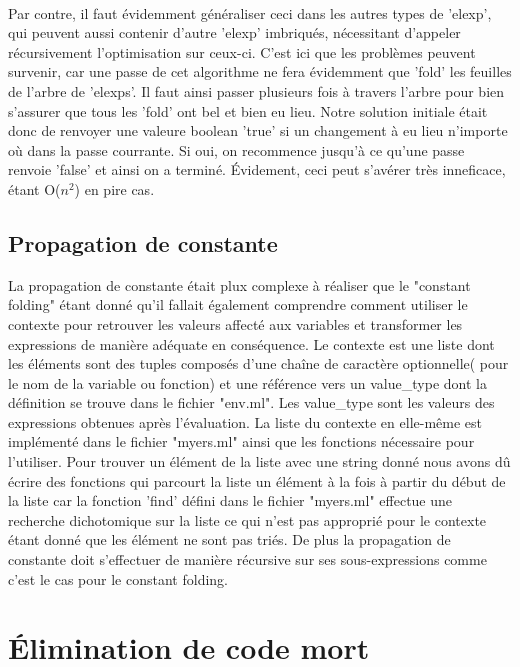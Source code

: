\documentclass{article}
\begin{document}
\paragraph{}
Par contre, il faut évidemment généraliser ceci dans les autres types de 'elexp', qui peuvent aussi contenir d'autre 'elexp' imbriqués, nécessitant d'appeler récursivement l'optimisation sur ceux-ci. C'est ici que les problèmes peuvent survenir, car une passe de cet algorithme ne fera évidemment que 'fold' les feuilles de l'arbre de 'elexps'. Il faut ainsi passer plusieurs fois à travers l'arbre pour bien s'assurer que tous les 'fold' ont bel et bien eu lieu. Notre solution initiale était donc de renvoyer une valeure boolean 'true' si un changement à eu lieu n'importe où dans la passe courrante. Si oui, on recommence jusqu'à ce qu'une passe renvoie 'false' et ainsi on a terminé. Évidement, ceci peut s'avérer très inneficace, étant O($n^2$) en pire cas.


\subsection{Propagation de constante}

La propagation de constante était plux complexe à réaliser que le "constant
folding" étant donné qu'il fallait également comprendre comment utiliser le 
contexte pour retrouver les valeurs affecté aux variables et transformer les
expressions de manière adéquate en conséquence. Le contexte est une liste dont
les éléments sont des tuples composés d'une chaîne de caractère optionnelle(
pour le nom de la variable ou fonction) et une référence vers un value\_type
dont la définition se trouve dans le fichier "env.ml". Les value\_type sont
les valeurs des expressions obtenues après l'évaluation. La liste du contexte
en elle-même est implémenté dans le fichier "myers.ml" ainsi que les fonctions
nécessaire pour l'utiliser. Pour trouver un élément de la liste avec une
string donné nous avons dû écrire des fonctions qui parcourt la liste un 
élément à la fois à partir du début de la liste car la fonction 'find' défini
dans le fichier "myers.ml" effectue une recherche dichotomique sur la liste ce
qui n'est pas approprié pour le contexte étant donné que les élément ne sont
pas triés. De plus la propagation de constante doit s'effectuer de manière 
récursive sur ses sous-expressions comme c'est le cas pour le constant folding.

\section{Élimination de code mort}
\end{document}
